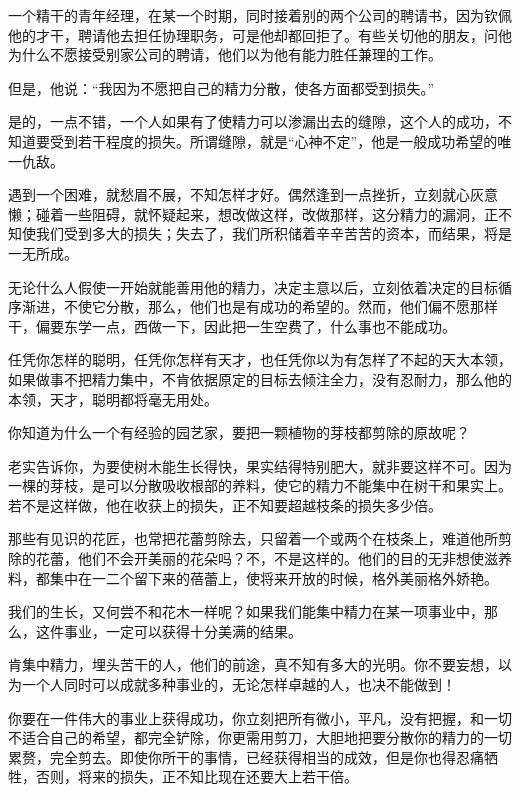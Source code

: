 \documentclass[UTF8,a4paper,8pt]{ctexart}
\begin{document}
		
		一个精干的青年经理，在某一个时期，同时接着别的两个公司的聘请书，因为钦佩他的才干，聘请他去担任协理职务，可是他却都回拒了。有些关切他的朋友，问他为什么不愿接受别家公司的聘请，他们以为他有能力胜任兼理的工作。
		
		
		但是，他说：“我因为不愿把自己的精力分散，使各方面都受到损失。”
		
		
		是的，一点不错，一个人如果有了使精力可以渗漏出去的缝隙，这个人的成功，不知道要受到若干程度的损失。所谓缝隙，就是“心神不定”，他是一般成功希望的唯一仇敌。
		
		
		遇到一个困难，就愁眉不展，不知怎样才好。偶然逢到一点挫折，立刻就心灰意懒；碰着一些阻碍，就怀疑起来，想改做这样，改做那样，这分精力的漏洞，正不知使我们受到多大的损失；失去了，我们所积储着辛辛苦苦的资本，而结果，将是一无所成。
		
		
		无论什么人假使一开始就能善用他的精力，决定主意以后，立刻依着决定的目标循序渐进，不使它分散，那么，他们也是有成功的希望的。然而，他们偏不愿那样干，偏要东学一点，西做一下，因此把一生空费了，什么事也不能成功。
		
		
		任凭你怎样的聪明，任凭你怎样有天才，也任凭你以为有怎样了不起的天大本领，如果做事不把精力集中，不肯依据原定的目标去倾注全力，没有忍耐力，那么他的本领，天才，聪明都将毫无用处。
		
		
		你知道为什么一个有经验的园艺家，要把一颗植物的芽枝都剪除的原故呢？
		
		
		老实告诉你，为要使树木能生长得快，果实结得特别肥大，就非要这样不可。因为一棵的芽枝，是可以分散吸收根部的养料，使它的精力不能集中在树干和果实上。若不是这样做，他在收获上的损失，正不知要超越枝条的损失多少倍。
		
		
		那些有见识的花匠，也常把花蕾剪除去，只留着一个或两个在枝条上，难道他所剪除的花蕾，他们不会开美丽的花朵吗？不，不是这样的。他们的目的无非想使滋养料，都集中在一二个留下来的蓓蕾上，使将来开放的时候，格外美丽格外娇艳。
		
		
		我们的生长，又何尝不和花木一样呢？如果我们能集中精力在某一项事业中，那么，这件事业，一定可以获得十分美满的结果。
		
		
		肯集中精力，埋头苦干的人，他们的前途，真不知有多大的光明。你不要妄想，以为一个人同时可以成就多种事业的，无论怎样卓越的人，也决不能做到！
		
		
		你要在一件伟大的事业上获得成功，你立刻把所有微小，平凡，没有把握，和一切不适合自己的希望，都完全铲除，你更需用剪刀，大胆地把要分散你的精力的一切累赘，完全剪去。即使你所干的事情，已经获得相当的成效，但是你也得忍痛牺牲，否则，将来的损失，正不知比现在还要大上若干倍。
		
\end{document}
